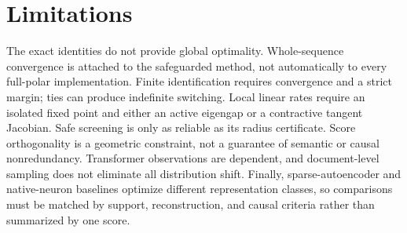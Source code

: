 \section{Limitations}
\label{sec:limitations}
The exact identities do not provide global optimality. Whole-sequence convergence is attached to the safeguarded method, not automatically to every full-polar implementation. Finite identification requires convergence and a strict margin; ties can produce indefinite switching. Local linear rates require an isolated fixed point and either an active eigengap or a contractive tangent Jacobian. Safe screening is only as reliable as its radius certificate. Score orthogonality is a geometric constraint, not a guarantee of semantic or causal nonredundancy. Transformer observations are dependent, and document-level sampling does not eliminate all distribution shift. Finally, sparse-autoencoder and native-neuron baselines optimize different representation classes, so comparisons must be matched by support, reconstruction, and causal criteria rather than summarized by one score.


